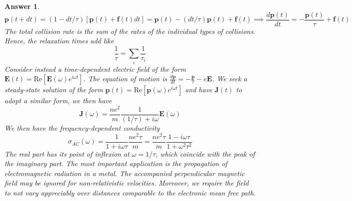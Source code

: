 \documentclass[a4paper]{article}
\newtheorem{ans}{Answer}[subsection]
\theoremstyle{new}
\begin{document}
\begin{ans}
$$\mathbf{p}(t+dt)=(1-dt/\tau)[\mathbf{p}(t)+\mathbf{f}(t)dt]=\mathbf{p}(t)-(dt/\tau)\mathbf{p}(t)+\mathbf{f}(t)\implies\frac{d\mathbf{p}(t)}{dt}=-\frac{\mathbf{p}(t)}{\tau}+\mathbf{f}(t)$$
The total collision rate is the sum of the rates of the individual types of collisions. Hence, the relaxation times add like
$$\frac{1}{\tau}=\sum_i\frac{1}{\tau_i}$$
Consider instead a time-dependent electric field of the form $\mathbf{E}(t)=\text{Re}[\mathbf{E}(\omega)e^{i\omega t}]$. The equation of motion is $\frac{d\mathbf{p}}{dt}=-\frac{\mathbf{p}}{\tau}-e\mathbf{E}$. We seek a steady-state solution of the form $\mathbf{p}(t)=\text{Re}[\mathbf{p}(\omega)e^{i\omega t}]$ and have $\mathbf{J}(t)$ to adopt a similar form, we then have
$$\mathbf{J}(\omega)=\frac{ne^2}{m}\frac{1}{(1/\tau)+i\omega}\mathbf{E}(\omega)$$
We then have the frequency-dependent conductivity
$$\sigma_{AC}(\omega)=\frac{1}{1+i\omega\tau}\frac{ne^2\tau}{m}=\frac{ne^2\tau}{m}\frac{1-i\omega\tau}{1+\omega^2\tau^2}$$
The real part has its point of inflexion at $\omega=1/\tau$, which coincide with the peak of the imaginary part. The most important application is the propagation of electromagnetic radiation in a metal. The accompanied perpendicular magnetic field may be ignored for non-relativistic velocities. Moreover, we require the field to not vary appreciably over distances comparable to the electronic mean free path.
\newpage

\end{ans}
\end{document}

